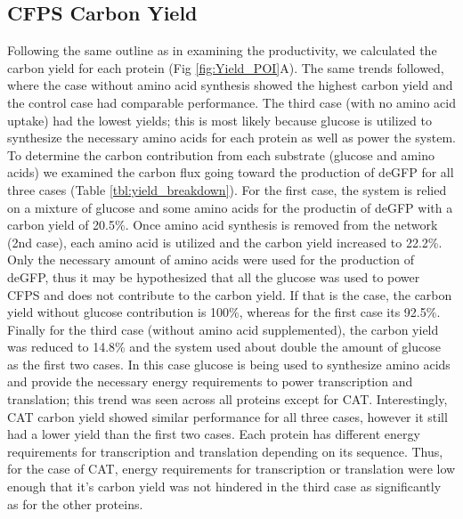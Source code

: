 \documentclass[journal=asbcd6,manuscript=article]{achemso}
\begin{document}
\subsection{CFPS Carbon Yield}
Following the same outline as in examining the productivity, we calculated the carbon yield for each protein (Fig \ref{fig:Yield_POI}A).
The same trends followed, where the case without amino acid synthesis showed the highest carbon yield and the control case had comparable performance.
The third case (with no amino acid uptake) had the lowest yields; this is most likely because glucose is utilized to synthesize the necessary amino acids for each protein as well as power the system. 
To determine the carbon contribution from each substrate (glucose and amino acids) we examined the carbon flux going toward the production of deGFP for all three cases (Table \ref{tbl:yield_breakdown}).
For the first case, the system is relied on a mixture of glucose and some amino acids for the productin of deGFP with a carbon yield of 20.5\%.
Once amino acid synthesis is removed from the network (2nd case), each amino acid is utilized and the carbon yield increased to 22.2\%.
Only the necessary amount of amino acids were used for the production of deGFP, thus it may be hypothesized that all the glucose was used to power CFPS and does not contribute to the carbon yield.
If that is the case, the carbon yield without glucose contribution is 100\%, whereas for the first case its 92.5\%.
Finally for the third case (without amino acid supplemented), the carbon yield was reduced to 14.8\% and the system used about double the amount of glucose as the first two cases.
In this case glucose is being used to synthesize amino acids and provide the necessary energy requirements to power transcription and translation; this trend was seen across all proteins except for CAT.
Interestingly, CAT carbon yield showed similar performance for all three cases, however it still had a lower yield than the first two cases.
Each protein has different energy requirements for transcription and translation depending on its sequence.
Thus, for the case of CAT, energy requirements for transcription or translation were low enough that it's carbon yield was not hindered in the third case as significantly as for the other proteins.
\end{document}
